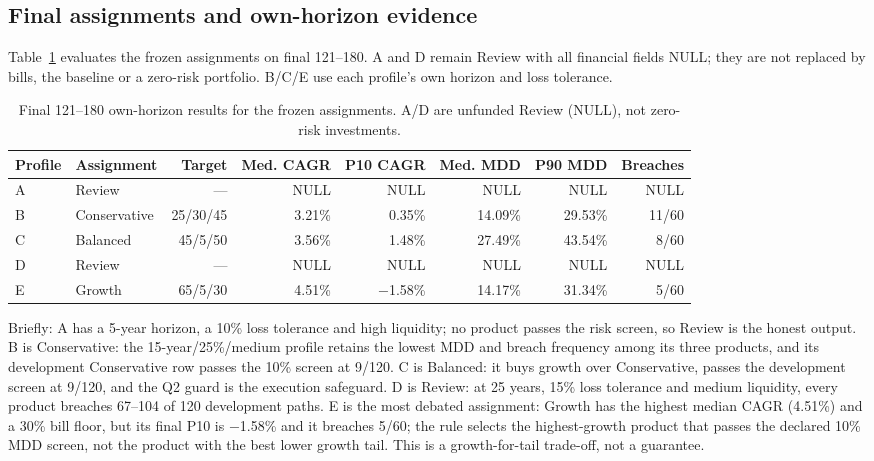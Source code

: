 \documentclass[11pt,a4paper]{article}
\begin{document}
\subsection{Final assignments and own-horizon evidence}
Table~\ref{tab:profiles} evaluates the frozen assignments on final 121--180. A and
D remain Review with all financial fields NULL; they are not replaced by bills,
the baseline or a zero-risk portfolio. B/C/E use each profile's own horizon and
loss tolerance.

\begin{table}[H]
\centering
\caption{Final 121--180 own-horizon results for the frozen assignments. A/D are
unfunded Review (NULL), not zero-risk investments.}
\label{tab:profiles}
\begin{tabular}{@{}llrrrrrr@{}}
\toprule
Profile & Assignment & Target & Med. CAGR & P10 CAGR & Med. MDD & P90 MDD & Breaches \\
\midrule
A & Review & --- & NULL & NULL & NULL & NULL & NULL \\
B & Conservative & 25/30/45 & 3.21\% & 0.35\% & 14.09\% & 29.53\% & 11/60 \\
C & Balanced & 45/5/50 & 3.56\% & 1.48\% & 27.49\% & 43.54\% & 8/60 \\
D & Review & --- & NULL & NULL & NULL & NULL & NULL \\
E & Growth & 65/5/30 & 4.51\% & $-$1.58\% & 14.17\% & 31.34\% & 5/60 \\
\bottomrule
\end{tabular}
\end{table}

Briefly: A has a 5-year horizon, a 10\% loss tolerance and high liquidity; no
product passes the risk screen, so Review is the honest output. B is
Conservative: the 15-year/25\%/medium profile retains the lowest MDD and breach
frequency among its three products, and its development Conservative row passes
the 10\% screen at 9/120. C is Balanced: it buys growth over Conservative, passes
the development screen at 9/120, and the Q2 guard is the execution safeguard.
D is Review: at 25 years, 15\% loss tolerance and medium liquidity, every product
breaches 67--104 of 120 development paths. E is the most debated assignment:
Growth has the highest median CAGR (4.51\%) and a 30\% bill floor, but its final
P10 is $-$1.58\% and it breaches 5/60; the rule selects the highest-growth product
that passes the declared 10\% MDD screen, not the product with the best lower
growth tail. This is a growth-for-tail trade-off, not a guarantee.
\end{document}
